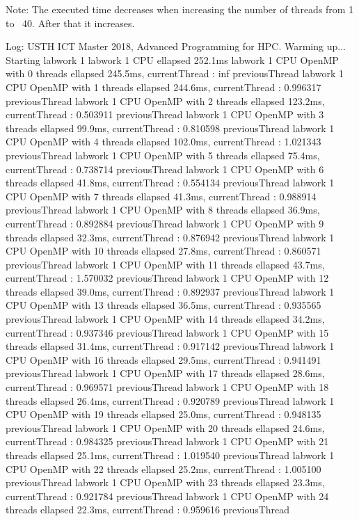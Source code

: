 Note: The executed time decreases when increasing the number of threads from 1 to ~40. After
that it increases.



Log:
USTH ICT Master 2018, Advanced Programming for HPC.
Warming up...
Starting labwork 1
labwork 1 CPU ellapsed 252.1ms
labwork 1 CPU OpenMP with 0 threads ellapsed 245.5ms, currentThread : inf previousThread
labwork 1 CPU OpenMP with 1 threads ellapsed 244.6ms, currentThread : 0.996317 previousThread
labwork 1 CPU OpenMP with 2 threads ellapsed 123.2ms, currentThread : 0.503911 previousThread
labwork 1 CPU OpenMP with 3 threads ellapsed 99.9ms, currentThread : 0.810598 previousThread
labwork 1 CPU OpenMP with 4 threads ellapsed 102.0ms, currentThread : 1.021343 previousThread
labwork 1 CPU OpenMP with 5 threads ellapsed 75.4ms, currentThread : 0.738714 previousThread
labwork 1 CPU OpenMP with 6 threads ellapsed 41.8ms, currentThread : 0.554134 previousThread
labwork 1 CPU OpenMP with 7 threads ellapsed 41.3ms, currentThread : 0.988914 previousThread
labwork 1 CPU OpenMP with 8 threads ellapsed 36.9ms, currentThread : 0.892884 previousThread
labwork 1 CPU OpenMP with 9 threads ellapsed 32.3ms, currentThread : 0.876942 previousThread
labwork 1 CPU OpenMP with 10 threads ellapsed 27.8ms, currentThread : 0.860571 previousThread
labwork 1 CPU OpenMP with 11 threads ellapsed 43.7ms, currentThread : 1.570032 previousThread
labwork 1 CPU OpenMP with 12 threads ellapsed 39.0ms, currentThread : 0.892937 previousThread
labwork 1 CPU OpenMP with 13 threads ellapsed 36.5ms, currentThread : 0.935565 previousThread
labwork 1 CPU OpenMP with 14 threads ellapsed 34.2ms, currentThread : 0.937346 previousThread
labwork 1 CPU OpenMP with 15 threads ellapsed 31.4ms, currentThread : 0.917142 previousThread
labwork 1 CPU OpenMP with 16 threads ellapsed 29.5ms, currentThread : 0.941491 previousThread
labwork 1 CPU OpenMP with 17 threads ellapsed 28.6ms, currentThread : 0.969571 previousThread
labwork 1 CPU OpenMP with 18 threads ellapsed 26.4ms, currentThread : 0.920789 previousThread
labwork 1 CPU OpenMP with 19 threads ellapsed 25.0ms, currentThread : 0.948135 previousThread
labwork 1 CPU OpenMP with 20 threads ellapsed 24.6ms, currentThread : 0.984325 previousThread
labwork 1 CPU OpenMP with 21 threads ellapsed 25.1ms, currentThread : 1.019540 previousThread
labwork 1 CPU OpenMP with 22 threads ellapsed 25.2ms, currentThread : 1.005100 previousThread
labwork 1 CPU OpenMP with 23 threads ellapsed 23.3ms, currentThread : 0.921784 previousThread
labwork 1 CPU OpenMP with 24 threads ellapsed 22.3ms, currentThread : 0.959616 previousThread
